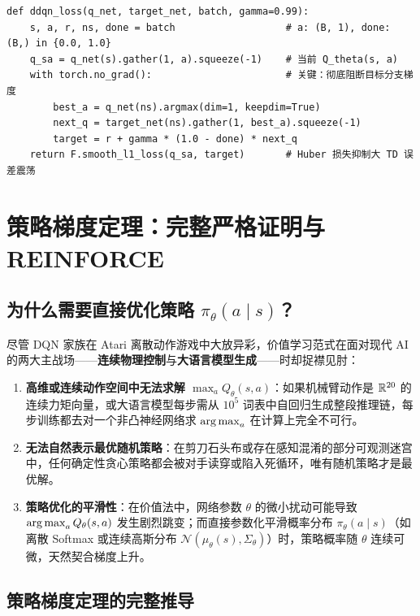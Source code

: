 \begin{lstlisting}[caption={Double DQN 核心损失函数与目标网络软更新（简洁 PyTorch 实现）}]
def ddqn_loss(q_net, target_net, batch, gamma=0.99):
    s, a, r, ns, done = batch                   # a: (B, 1), done: (B,) in {0.0, 1.0}
    q_sa = q_net(s).gather(1, a).squeeze(-1)    # 当前 Q_theta(s, a)
    with torch.no_grad():                       # 关键：彻底阻断目标分支梯度
        best_a = q_net(ns).argmax(dim=1, keepdim=True)
        next_q = target_net(ns).gather(1, best_a).squeeze(-1)
        target = r + gamma * (1.0 - done) * next_q
    return F.smooth_l1_loss(q_sa, target)       # Huber 损失抑制大 TD 误差震荡
\end{lstlisting}

\section{策略梯度定理：完整严格证明与 REINFORCE}
\label{sec:pg-theorem}

\subsection{为什么需要直接优化策略 $\pi_\theta(a \mid s)$？}

尽管 DQN 家族在 Atari 离散动作游戏中大放异彩，价值学习范式在面对现代 AI 的两大主战场——\textbf{连续物理控制}与\textbf{大语言模型生成}——时却捉襟见肘：
\begin{enumerate}
  \item \textbf{高维或连续动作空间中无法求解 $\max_a Q_\theta(s, a)$}：如果机械臂动作是 $\mathbb{R}^{20}$ 的连续力矩向量，或大语言模型每步需从 $10^5$ 词表中自回归生成整段推理链，每步训练都去对一个非凸神经网络求 $\operatorname*{arg\,max}_a$ 在计算上完全不可行。
  \item \textbf{无法自然表示最优随机策略}：在剪刀石头布或存在感知混淆的部分可观测迷宫中，任何确定性贪心策略都会被对手读穿或陷入死循环，唯有随机策略才是最优解。
  \item \textbf{策略优化的平滑性}：在价值法中，网络参数 $\theta$ 的微小扰动可能导致 $\operatorname*{arg\,max}_a Q_\theta(s, a)$ 发生剧烈跳变；而直接参数化平滑概率分布 $\pi_\theta(a \mid s)$（如离散 Softmax 或连续高斯分布 $\mathcal{N}(\mu_\theta(s), \Sigma_\theta)$）时，策略概率随 $\theta$ 连续可微，天然契合梯度上升。
\end{enumerate}

\subsection{策略梯度定理的完整推导}

